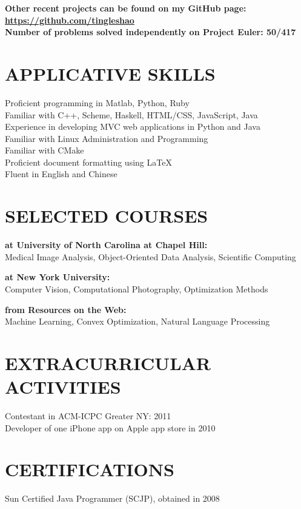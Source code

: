 \documentclass{res}
\begin{document}
\begin{resume}
\begin{tabbing}
    {\bf Other recent projects can be found on my GitHub page: \href{https://github.com/tingleshao}{\underline{https://github.com/tingleshao}}}\\[0.3cm]
    {\bf Number of problems solved independently on Project Euler: 50/417}
  \end{tabbing}

\section{APPLICATIVE SKILLS}
    \vspace{0.05in}
    Proficient programming in Matlab, Python, Ruby  \\
    Familiar with C++, Scheme, Haskell, HTML/CSS, JavaScript, Java\\
    Experience in developing MVC web applications in Python and Java\\
    Familiar with Linux Administration and Programming \\
    Familiar with CMake\\
    Proficient document formatting using \LaTeX \\
    Fluent in English and Chinese

\section{SELECTED COURSES}
     \vspace{-0.05in}	
    \begin{tabbing}
    {\bf at University of North Carolina at Chapel Hill:}\\
    Medical Image Analysis, Object-Oriented Data Analysis, Scientific Computing \\
    \end{tabbing}\vspace{-30pt}
         \begin{tabbing}
    {\bf at New York University:}\\
    Computer Vision, Computational Photography, Optimization Methods\\
        \end{tabbing}\vspace{-30pt}
         \begin{tabbing}
    {\bf from Resources on the Web:}\\
    Machine Learning, Convex Optimization, Natural Language Processing
            \end{tabbing}


\section{EXTRACURRICULAR ACTIVITIES}
    \vspace{0.05in}
    Contestant in ACM-ICPC Greater NY: 2011\\
    Developer of one iPhone app on Apple app store in 2010

 \section{CERTIFICATIONS}
  \vspace{0.05in}
    Sun Certified Java Programmer (SCJP), obtained in 2008\\

\end{resume}
\end{document}
